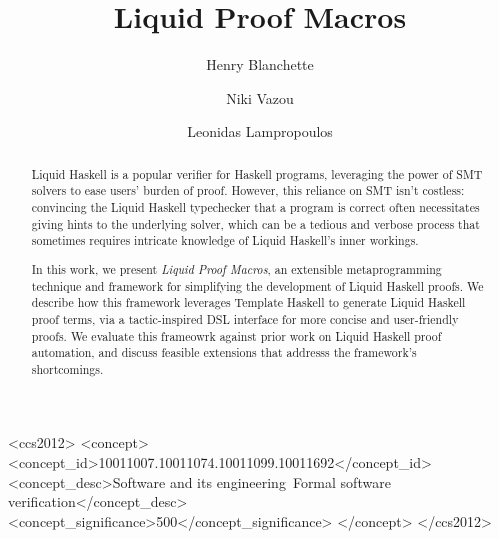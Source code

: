 \documentclass[sigplan,screen]{acmart}
\begin{document}
\title{Liquid Proof Macros}

\author{Henry Blanchette}

\author{Niki Vazou}

\author{Leonidas Lampropoulos}

\renewcommand{\shortauthors}{Blanchette et al.}

\begin{abstract}
Liquid Haskell is a popular verifier for Haskell programs,
leveraging the power of SMT solvers to ease users' burden of proof.
%
However, this reliance on SMT isn't costless: convincing the Liquid Haskell 
typechecker that a program is correct often necessitates giving hints to the
underlying solver, which can be a tedious and verbose process that sometimes 
requires intricate knowledge of Liquid Haskell's inner workings.

In this work, we present {\em Liquid Proof Macros}, an extensible
metaprogramming technique and framework for simplifying the
development of Liquid Haskell proofs.
%
We describe how this framework leverages Template Haskell 
to generate Liquid Haskell proof terms, via a tactic-inspired DSL interface for
more concise and user-friendly proofs.
We evaluate this frameowrk against prior work on Liquid Haskell proof 
automation, and discuss feasible extensions that addresss the framework's 
shortcomings.
\end{abstract}

\begin{CCSXML}
<ccs2012>
   <concept>
       <concept_id>10011007.10011074.10011099.10011692</concept_id>
       <concept_desc>Software and its engineering~Formal software verification</concept_desc>
       <concept_significance>500</concept_significance>
       </concept>
 </ccs2012>
\end{CCSXML}
\end{document}
